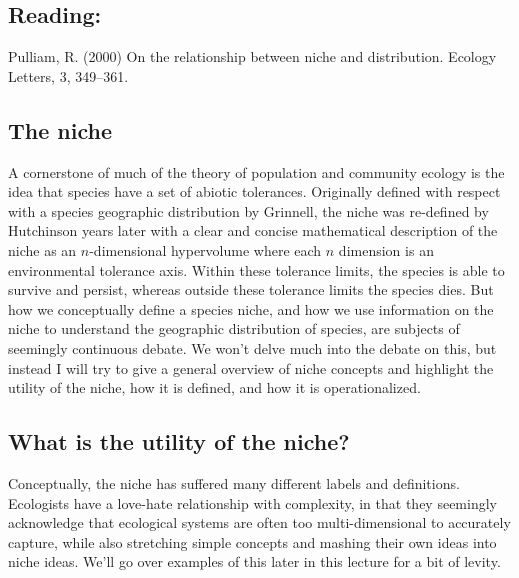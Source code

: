 \documentclass[12pt]{article}
\begin{document}
\subsection*{Reading:}

Pulliam, R. (2000) On the relationship between niche and distribution. Ecology Letters, 3, 349–361.










\begin{center}
\noindent\hrulefill 
\end{center}



\clearpage


\subsection*{The niche}

A cornerstone of much of the theory of population and community ecology is the idea that species have a set of abiotic tolerances. Originally defined with respect with a species geographic distribution by Grinnell, the niche was re-defined by Hutchinson years later with a clear and concise mathematical description of the niche as an $n$-dimensional hypervolume where each $n$ dimension is an environmental tolerance axis. Within these tolerance limits, the species is able to survive and persist, whereas outside these tolerance limits the species dies. But how we conceptually define a species niche, and how we use information on the niche to understand the geographic distribution of species, are subjects of seemingly continuous debate. We won't delve much into the debate on this, but instead I will try to give a general overview of niche concepts and highlight the utility of the niche, how it is defined, and how it is operationalized. 









\bigskip



\subsection*{What is the utility of the niche?}

Conceptually, the niche has suffered many different labels and definitions. Ecologists have a love-hate relationship with complexity, in that they seemingly acknowledge that ecological systems are often too multi-dimensional to accurately capture, while also stretching simple concepts and mashing their own ideas into niche ideas. We'll go over examples of this later in this lecture for a bit of levity. 
\end{document}
